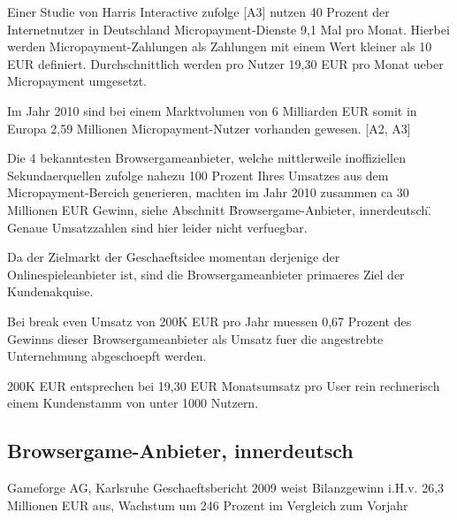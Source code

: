 Einer Studie von Harris Interactive zufolge [A3] nutzen 40 Prozent der
Internetnutzer in Deutschland Micropayment-Dienste 9,1 Mal pro Monat. Hierbei werden
Micropayment-Zahlungen als Zahlungen mit einem Wert kleiner als 10 EUR
definiert. Durchschnittlich werden pro Nutzer 19,30 EUR pro Monat ueber
Micropayment umgesetzt. \newline 

Im Jahr 2010 sind bei einem Marktvolumen von 6 Milliarden EUR somit in Europa
2,59 Millionen Micropayment-Nutzer vorhanden gewesen. [A2, A3] \newline 

Die 4 bekanntesten Browsergameanbieter, welche mittlerweile inoffiziellen
Sekundaerquellen zufolge nahezu 100 Prozent Ihres Umsatzes aus dem
Micropayment-Bereich generieren, machten im Jahr 2010 zusammen ca 30 Millionen
EUR Gewinn, siehe Abschnitt \"Browsergame-Anbieter, innerdeutsch\". Genaue
Umsatzzahlen sind hier leider nicht verfuegbar. \newline

Da der Zielmarkt der Geschaeftsidee momentan derjenige der Onlinespieleanbieter
ist, sind die Browsergameanbieter primaeres Ziel der Kundenakquise. \newline

Bei break even Umsatz von 200K EUR pro Jahr muessen 0,67 Prozent des Gewinns
dieser Browsergameanbieter als Umsatz fuer die angestrebte Unternehmung
abgeschoepft werden.  \newline 

200K EUR entsprechen bei 19,30 EUR Monatsumsatz pro User rein rechnerisch einem
Kundenstamm von unter 1000 Nutzern. \newline 


\subsection{Browsergame-Anbieter, innerdeutsch}


Gameforge AG, Karlsruhe\newline \newline
Geschaeftsbericht 2009 weist Bilanzgewinn i.H.v. 26,3 Millionen EUR aus,
Wachstum um 246 Prozent im Vergleich zum Vorjahr \newline

